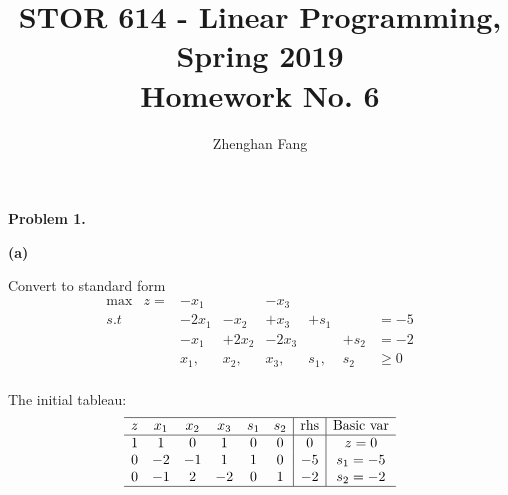 \documentclass[12pt]{article}
\def\name{Zhenghan Fang}
\begin{document}
 


\title{STOR 614 - Linear Programming, Spring 2019 \\
Homework No. 6}
\author{\name}

\maketitle

\noindent
\textbf{Problem 1.}

\noindent
\textbf{(a)}

Convert to standard form
\begin{equation*}
  \begin{array}{cccccccc}
    \text{max}& z= &      -x_1    &   & -x_3 &  &   &      \\ 
    s.t       &    &    -2x_1      &   - x_2 &    +x_3 &    +s_1 &             &  =-5              \\
              &    &    -x_1      &    +2x_2 &    -2x_3 &     &     +s_2        &  = -2          \\
              &    &    x_1,      &    x_2, &    x_3, &    s_1, &     s_2        &  \ge 0          \\ 
  \end{array}
\end{equation*}

The initial tableau:
\begin{equation*}
  \begin{array}{cccccc|c|c}
    \hline
    z &  x_1      &  x_2 &  x_3 &  s_1 & s_2 &   \text{rhs} & \text{Basic var}  \\ \hline
    1 &    1      &    0 &    1 &    0 & 0    & 0        &  z=0              \\
    0 &    -2      &    -1 &    1 &    1 &    0 & -5        &  s_1 = -5          \\
    0 &    -1      &    2 &    -2 &    0 &    1 & -2        &  s_2 = -2          \\ \hline
  \end{array}
\end{equation*}
\end{document}
